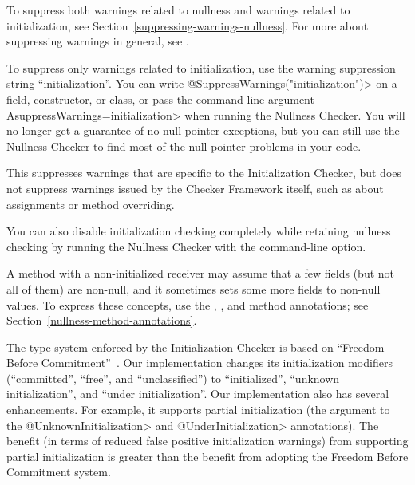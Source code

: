 
To suppress both warnings related to nullness and warnings related to initialization,
see Section~\ref{suppressing-warnings-nullness}.
For more about suppressing warnings in general, see
.

To suppress only warnings related to initialization, use the
warning suppression string ``initialization''.
You can write \<@SuppressWarnings("initialization")>
on a field, constructor, or
class, or pass the command-line argument
\<-AsuppressWarnings=initialization> when
running the Nullness Checker.
You will no longer get a guarantee
of no null pointer exceptions, but you can still use the Nullness Checker
to find most of the null-pointer problems in your code.

This suppresses warnings that are specific to the Initialization Checker,
but does not suppress warnings issued by the Checker Framework itself, such
as about assignments or method overriding.

You can also disable initialization checking completely while retaining
nullness checking by running the Nullness Checker with the
 command-line option.




A method with a non-initialized receiver may assume that a few fields (but not all
of them) are non-null, and it sometimes sets some more fields to non-null
values.  To express these concepts, use the
,
, and
 method annotations;
see Section~\ref{nullness-method-annotations}.



The type system enforced by the Initialization Checker is based on
``Freedom Before Commitment''~\cite{SummersM2011}.  Our implementation
changes its initialization modifiers (``committed'', ``free'', and
``unclassified'') to ``initialized'', ``unknown initialization'', and
``under initialization''.  Our implementation also has several
enhancements.  For example, it supports partial initialization (the
argument to the \<@UnknownInitialization> and \<@UnderInitialization>
annotations).  The benefit (in terms of reduced false positive
initialization warnings) from supporting partial initialization is
greater than the benefit from adopting the Freedom Before Commitment system.



